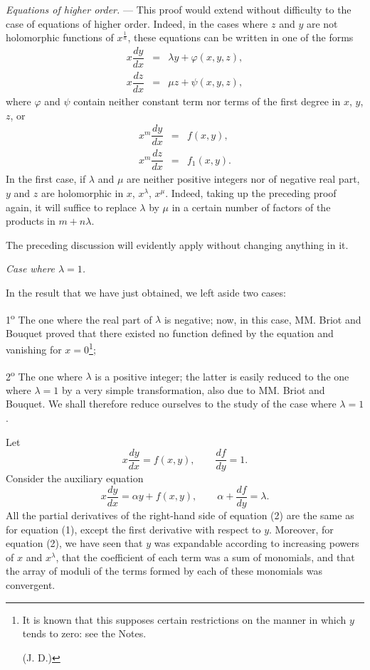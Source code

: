 \documentclass[11pt]{article}
\begin{document}
\emph{Equations of higher order.} — This proof would extend without difficulty to the case of equations of higher order. Indeed, in the cases where $z$ and $y$ are not holomorphic functions of $x^{\frac1n}$, these equations can be written in one of the forms
\[
\begin{array}{rcl}
x\dfrac{dy}{dx}&=&\lambda y+\varphi(x,y,z),\\[0.5em]
x\dfrac{dz}{dx}&=&\mu z+\psi(x,y,z),
\end{array}
\]
where $\varphi$ and $\psi$ contain neither constant term nor terms of the first degree in $x$, $y$, $z$, or
\[
\begin{array}{rcl}
x^m\dfrac{dy}{dx}&=&f(x,y),\\[0.5em]
x^m\dfrac{dz}{dx}&=&f_1(x,y).
\end{array}
\]
In the first case, if $\lambda$ and $\mu$ are neither positive integers nor of negative real part, $y$ and $z$ are holomorphic in $x$, $x^\lambda$, $x^\mu$. Indeed, taking up the preceding proof again, it will suffice to replace $\lambda$ by $\mu$ in a certain number of factors of the products in $m+n\lambda$.

The preceding discussion will evidently apply without changing anything in it.

\begin{center}
\emph{Case where $\lambda=1$.}
\end{center}

In the result that we have just obtained, we left aside two cases:

1\textsuperscript{o} The one where the real part of $\lambda$ is negative; now, in this case, MM. Briot and Bouquet proved that there existed no function defined by the equation and vanishing for $x=0$\footnote[1]{It is known that this supposes certain restrictions on the manner in which $y$ tends to zero: see the Notes.\par\hfill (J. D.)};

2\textsuperscript{o} The one where $\lambda$ is a positive integer; the latter is easily reduced to the one where $\lambda=1$ by a very simple transformation, also due to MM. Briot and Bouquet. We shall therefore reduce ourselves to the study of the case where $\lambda=1$.

Let
\begin{equation*}\tag{1}
x\frac{dy}{dx}=f(x,y),\qquad \frac{df}{dy}=1.
\end{equation*}
Consider the auxiliary equation
\begin{equation*}\tag{2}
x\frac{dy}{dx}=\alpha y+f(x,y),\qquad \alpha+\frac{df}{dy}=\lambda.
\end{equation*}
All the partial derivatives of the right-hand side of equation (2) are the same as for equation (1), except the first derivative with respect to $y$. Moreover, for equation (2), we have seen that $y$ was expandable according to increasing powers of $x$ and $x^\lambda$, that the coefficient of each term was a sum of monomials, and that the array of moduli of the terms formed by each of these monomials was convergent.
\end{document}
